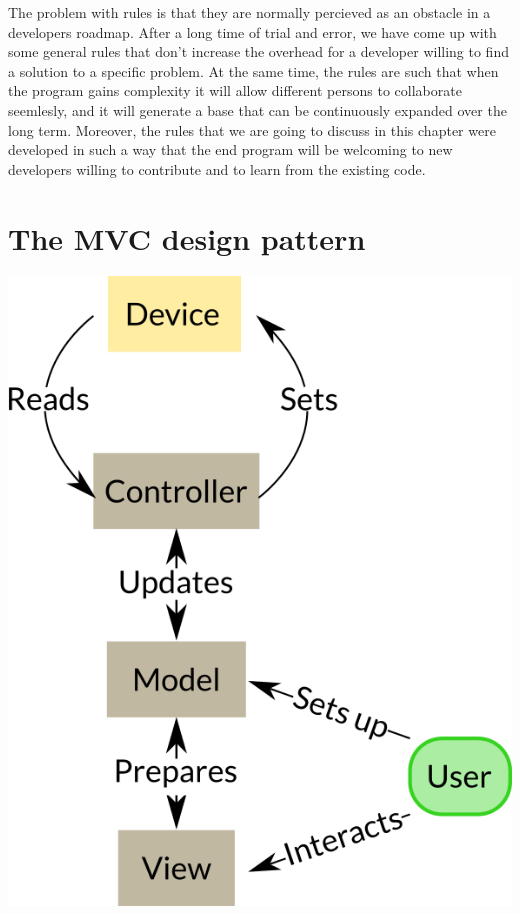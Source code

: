 The problem with rules is that they are normally percieved as an obstacle in a developers roadmap. After a long time of trial and error, we have come up with some general rules that don't increase the overhead for a developer willing to find a solution to a specific problem. At the same time, the rules are such that when the program gains complexity it will allow different persons to collaborate seemlesly, and it will generate a base that can be continuously expanded over the long term. Moreover, the rules that we are going to discuss in this chapter were developed in such a way that the end program will be welcoming to new developers willing to contribute and to learn from the existing code. 

\section{The MVC design pattern}\label{the-mvc-designpattern}
\begin{center}
\includegraphics{images/Chapter_04/MVCs.png}
\end{center}

